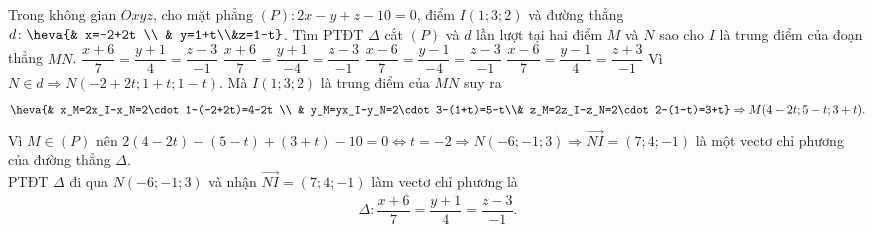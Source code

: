 \begin{ex}%
	Trong không gian $Oxyz$, cho mặt phẳng $(P)\colon 2x-y+z-10=0$, điểm $I(1;3;2)$ và đường thẳng $d\colon \heva{& x=-2+2t \\ & y=1+t\\&z=1-t}$. Tìm PTĐT $\Delta$ cắt $(P)$ và $d$ lần lượt tại hai điểm $M$ và $N$ sao cho $I$ là trung điểm của đoạn thẳng $MN$.
	\choice
	{\True $\dfrac{x+6}{7}=\dfrac{y+1}{4}=\dfrac{z-3}{-1}$}
	{$\dfrac{x+6}{7}=\dfrac{y+1}{-4}=\dfrac{z-3}{-1}$}
	{$\dfrac{x-6}{7}=\dfrac{y-1}{-4}=\dfrac{z-3}{-1}$}
	{$\dfrac{x-6}{7}=\dfrac{y-1}{4}=\dfrac{z+3}{-1}$}
	\loigiai
	{
		Vì $N\in d\Rightarrow N(-2+2t;1+t;1-t)$. Mà $I(1;3;2)$ là trung điểm của $MN$ suy ra
		\begin{align*}
			\heva{& x_M=2x_I-x_N=2\cdot 1-(-2+2t)=4-2t \\ & y_M=yx_I-y_N=2\cdot 3-(1+t)=5-t\\& z_M=2z_I-z_N=2\cdot 2-(1-t)=3+t}\Rightarrow M(4-2t;5-t;3+t).
		\end{align*}
		Vì $M\in (P)$ nên $2(4-2t)-(5-t)+(3+t)-10=0\Leftrightarrow t=-2\Rightarrow N(-6;-1;3)\Rightarrow \overrightarrow{NI}=(7;4;-1)$ là một vectơ chỉ phương của đường thẳng $\Delta$.\\
		PTĐT $\Delta$ đi qua $N(-6;-1;3)$ và nhận $\overrightarrow{NI}=(7;4;-1)$ làm vectơ chỉ phương là
		\begin{align*}
			\Delta \colon \dfrac{x+6}{7}=\dfrac{y+1}{4}=\dfrac{z-3}{-1}.
		\end{align*}
	}
\end{ex}

